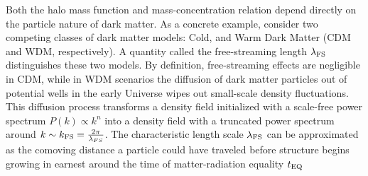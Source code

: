 Both the halo mass function and mass-concentration relation depend directly on the particle nature of dark matter. As a concrete example, consider two competing classes of dark matter models: Cold, and Warm Dark Matter (CDM and WDM, respectively). A quantity called the free-streaming length $\lambda_{\rm{FS}}$ distinguishes these two models. By definition, free-streaming effects are negligible in CDM, while in WDM scenarios the diffusion of dark matter particles out of potential wells in the early Universe wipes out small-scale density fluctuations. This diffusion process transforms a density field initialized with a scale-free power spectrum $P\left(k\right) \propto k^{n}$ into a density field with a truncated power spectrum around $k \sim k_{\rm{FS}} = \frac{2 \pi}{\lambda_{FS}}$. The characteristic length scale $\lambda_{\rm{FS}}$ can be approximated as the comoving distance a particle could have traveled before structure begins growing in earnest around the time of matter-radiation equality $t_{\rm{EQ}}$ \cite{Schneider++12} 
